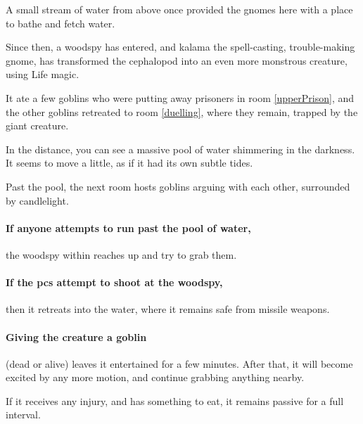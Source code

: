 \begin{multicols}{2}
\begin{exampletext}

  A small stream of water from above once provided the gnomes here with a place to bathe and fetch water.

  Since then, a woodspy has entered, and \gls{kalama} the spell-casting, trouble-making gnome, has transformed the cephalopod into an even more monstrous creature, using Life magic.

  It ate a few goblins who were putting away prisoners in room \vref{upperPrison}, and the other goblins retreated to room \vref{duelling}, where they remain, trapped by the giant creature.

\end{exampletext}

\begin{boxtext}
  In the distance, you can see a massive pool of water shimmering in the darkness.
  It seems to move a little, as if it had its own subtle tides.

  Past the pool, the next room hosts goblins arguing with each other, surrounded by candlelight.
\end{boxtext}


\paragraph{If anyone attempts to run past the pool of water,}
the woodspy within reaches up and try to grab them.

\paragraph{If the \glspl{pc} attempt to shoot at the woodspy,}
then it retreats into the water, where it remains safe from missile weapons.

\paragraph{Giving the creature a goblin}
(dead or alive)
leaves it entertained for a few minutes.
After that, it will become excited by any more motion, and continue grabbing anything nearby.

If it receives any injury, and has something to eat, it remains passive for a full \gls{interval}.


\begin{exampletext}


\end{exampletext}
\end{multicols}
